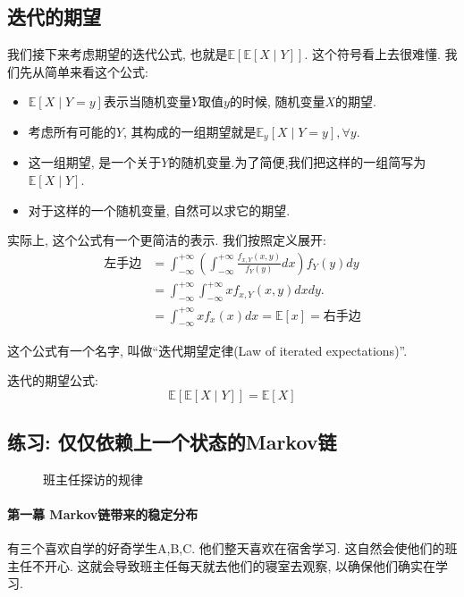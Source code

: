     \subsection{迭代的期望}

    我们接下来考虑期望的迭代公式, 也就是$\mathbb{E}[\mathbb{E}[X \mid Y]]$. 这个符号看上去很难懂. 我们先从简单来看这个公式: 
    \begin{itemize}
        \item $\mathbb{E}[X \mid Y=y]$表示当随机变量$Y$取值$y$的时候, 随机变量$X$的期望. 
        \item 考虑所有可能的$Y$, 其构成的一组期望就是$\mathbb{E}_y[X \mid Y=y], \forall y$. 
        \item 这一组期望, 是一个关于$Y$的随机变量.为了简便,我们把这样的一组简写为$\mathbb{E}[X \mid Y]$.
        \item 对于这样的一个随机变量, 自然可以求它的期望. 
    \end{itemize}

    实际上, 这个公式有一个更简洁的表示. 我们按照定义展开: 
    $$\begin{aligned} \text{左手边} & =\int_{-\infty}^{+\infty}\left(\int_{-\infty}^{+\infty} \frac{f_{x, Y}(x, y)}{f_Y(y)} d x\right) f_Y(y) d y \\ & =\int_{-\infty}^{+\infty} \int_{-\infty}^{+\infty} x f_{x, Y}(x, y) d x d y . \\ & =\int_{-\infty}^{+\infty} x f_x(x) d x=\mathbb{E}[x]=\text{右手边}\end{aligned}$$

    这个公式有一个名字, 叫做``迭代期望定律(Law of iterated expectations)''. 

    \begin{theorem}
        迭代的期望公式:$$
\mathbb{E}[{\mathbb{E}}[X \mid Y]]=\mathbb{E}[X]
$$
    \end{theorem}

    \subsection{练习: 仅仅依赖上一个状态的Markov链}

        \begin{wrapfigure}{l}{0.4\textwidth}
        \begin{center}
            
        \end{center}
        \caption{班主任探访的规律}
        \label{fig:meeting-supervisor-pattern}
    \end{wrapfigure}
    \paragraph{第一幕 Markov链带来的稳定分布} 有三个喜欢自学的好奇学生A,B,C. 他们整天喜欢在宿舍学习. 这自然会使他们的班主任不开心. 这就会导致班主任每天就去他们的寝室去观察, 以确保他们确实在学习. 
    
